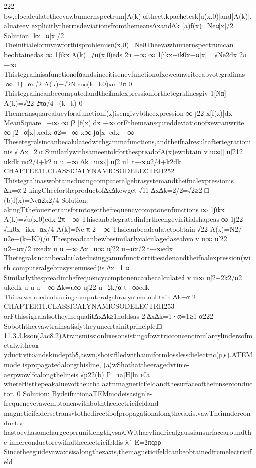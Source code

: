 {{{{{{{{{{{{{{{{222
bw,elocalculatetheevawbumernspectrum|A(k)|oftheet,kpachetcsk|u(x,0)|and|A(k)|,aluateev
explicitlythermsdeviationsfromthemeans∆xand∆k
(a)f(x)=Neα|x|/2
Solution:
kx=α|x|/2
Theinitialeformvawforthisproblemisu(x,0)=Ne0Theevawbumernspectrumcan
beobtainedas
∞
1∫ikx
A(k)=√u(x,0)eds
2π
−∞
∞
1∫ikx+ik0x−α|x|
=√Ne2dx
2π
−∞
Thistegralinisafunctionofαandsinceitisenevfunctionofxewcanwriteeabvotegralinas
∞
1∫−αx/2
A(k)=√2Ncos(k−k0)xe
2π
0
Thistegralincanbecomputedandtheifnalexpressionforthetegralinesgiv
1[Nα]
A(k)=√22
2πα/4+(k−k)
0
Themeansquarealuevforafunctionf(x)isengivybtheexpression
∞
∫22
x[f(x)]dx
MeanSquare=−∞
∞
∫2
[f(x)]dx
−∞
orFthemeansqureddeviationofxewcanwrite
∞
∫2−α|x|
xedx
σ2=−∞
x∞
∫α|x|
edx
−∞
Thesetegralsincanbecalulatedwithgammafunctions,andtheifnalresultaftertegrationinis
√
∆x=2
α
SimilarlywithsameentokforthespreadofA(x)ewobtain
v
u∞[]
u∫212
ukdk
uα2/4+k2
u
u
−∞
∆k=u∞[]
u∫2
u1
t−∞α2/4+k2dk
CHAPTER11.CLASSICALYNAMICSODELECTRII252
Thistegralinaswobtainedusingcomputeralgebrasystemandtheifnalexpressionis
∆k=α
2
kingChecfortheproductof∆x∆kewget
√11
∆x∆k=2/2=√2≥2
□
(b)f(x)=Neα2x2/4
Solution:
akingTthefouerietransformtogetthefrequencycomptonenfunctions
∞
1∫ikx
A(k)=√u(x,0)edx
2π
−∞
Thiscanbetegratedinfortheengevinitialshapeas
∞
1∫22
√ik0x−ikx−αx/4
A(k)=Ne
π
2
−∞
Thsicanbecalculatetoobtain
√22
A(k)=N2/α2e−(k−K0)/α
Thespreadcanbewbesimilarlycalculagedaseabvo
v
u∞
u∫22
u2−αx/2
uxedx
u
u
−∞
∆x=u∞
u∫22
u−αx/2
t−∞edx
Thetegralsincanbecalculatedusinggammfunctiontitiesidenandtheifnalexpression(with
computeralgebrasystemused)is
∆x=1
α
Similarlythespreadinthefrequencycomptonencanbecalculated
v
u∞
u∫2−2k2/α2
ukedk
u
u
u
−∞
∆k=u∞
u∫22
u−2k/α
t−∞edk
Thisaswalsoedsolvusingcomputeralgebrasystemtoobtain
∆k=α
2
CHAPTER11.CLASSICALYNAMICSODELECTRII253
orFthissignalalsotheyinequalit∆x∆k≥1holdsas
2
∆x∆k=1·α=1≥1
α222
Soboththeevawtrainsatisfytheyuncertainitprinciple.□
11.3.3.kson(Jac8.2)Atransmissionlinesonsistingofowttricconcencircularcylindersofmetalwithcon-
yductivitσandskindepthδ,aswn,shoisiflledwithauniformlosslessdielectric(µ,ϵ).ATEMmode
ispropagatedalongthisline,
(a)wShothattheeragedvtime-aerpwowlfoalongthelineis
√µ22(b)
P=πa|H|ln
ϵ0a
whereHisthepeakaluevoftheuthalazimmagneticifeldandthesurfaceoftheinnserconductor.
0
Solution:
BydeifnitionaTEMmodeisasignle-frequencyevawcmptonenwithboththeelectricifeldand
magneticifeldersetransvtothedirectioofpropagationalongtheeaxis.vawTheinnderconductor
hastoevhasomehargecperunitlength,ysaλ.Withacylindricalgaussiansurfacearoundthe
innerconductorewifndtheelectricifeldis
λˆ
E=2πϵρρ
Sincetheeguidevawaxisisalongthezaxis,themagneticifeldcanbeobtainedfromelectricifeld
}}}}}}}}}}}}}}}}

